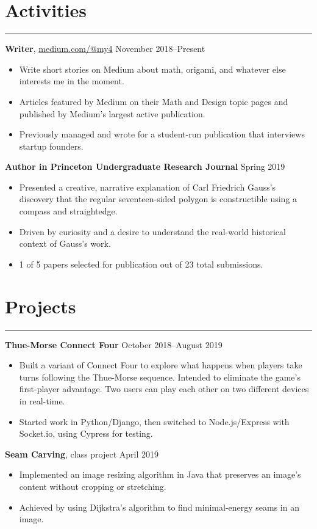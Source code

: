 \documentclass[10pt]{article}
\newcommand{\resumesection}[1]{\vspace{-0.2cm}\section*{#1}\vspace{-0.2cm}\hrule\vspace{0.2cm}}
\begin{document}
\resumesection{Activities}

\textbf{Writer}, \href{https://medium.com/@my4}{medium.com/@my4} \hfill November 2018--Present
\begin{itemize}
	\item Write short stories on Medium about math, origami, and whatever else interests me in the moment.
	\item Articles featured by Medium on their Math and Design topic pages and published by Medium's largest active publication.
	\item Previously managed and wrote for a student-run publication that interviews startup founders.
\end{itemize}

\textbf{Author in Princeton Undergraduate Research Journal} \hfill Spring 2019
\begin{itemize}
	\item Presented a creative, narrative explanation of Carl Friedrich Gauss's discovery that the regular seventeen-sided polygon is constructible using a compass and straightedge.
	\item Driven by curiosity and a desire to understand the real-world historical context of Gauss's work.
	\item 1 of 5 papers selected for publication out of 23 total submissions.
\end{itemize}

\resumesection{Projects}

\textbf{Thue-Morse Connect Four}  \hfill October 2018--August 2019
\begin{itemize}
	\item Built a variant of Connect Four to explore what happens when players take turns following the Thue-Morse sequence. Intended to eliminate the game's first-player advantage. Two users can play each other on two different devices in real-time.
	\item Started work in Python/Django, then switched to Node.js/Express with Socket.io, using Cypress for testing.
\end{itemize}

\textbf{Seam Carving}, class project \hfill April 2019
\begin{itemize}
	\item Implemented an image resizing algorithm in Java that preserves an image's content without cropping or stretching.
	\item Achieved by using Dijkstra's algorithm to find minimal-energy seams in an image.
\end{itemize}
\end{document}
